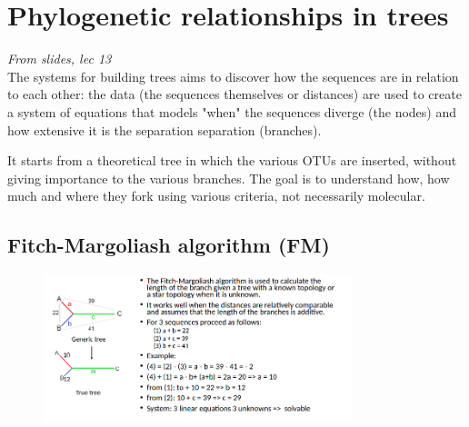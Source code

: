 \section{Phylogenetic relationships in trees}
\emph{From slides, lec 13}
\\
The systems for building trees aims to discover how the sequences are in
relation to each other: the data (the sequences themselves or distances) are used to create a system of equations that models "when" the sequences diverge (the nodes) and how extensive it is the separation separation (branches).

It starts from a theoretical tree in which the various OTUs are inserted, without giving importance to the various branches. The goal is to understand how, how much and where they fork using various criteria, not necessarily molecular.

\subsection{Fitch-Margoliash algorithm (FM)}
\begin{figure}[H]
		\centering
		\includegraphics[width=0.8\textwidth]{ex1.png}
		\caption{}
		\label{fig:ex1}
	\end{figure}
